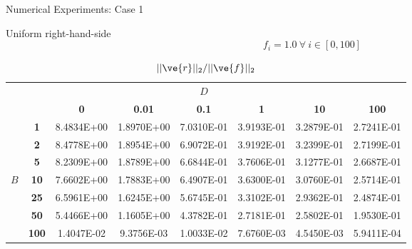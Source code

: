 \documentclass{beamer}
\begin{document}
\begin{frame}{Numerical Experiments: Case 1}

  Uniform right-hand-side
  \[
  f_i = 1.0\ \forall\ i \in [0,100]
  \]

  {\tiny
    \begin{table}[htpb!]
      \begin{center}
        \caption{$||\ve{r}||_2 / ||\ve{f}||_2$}
        \begin{tabular}{cccccccc}\hline\hline
          \multicolumn{1}{c}{} & \multicolumn{1}{c}{}&
          \multicolumn{1}{c}{}& \multicolumn{1}{c}{}&
          \multicolumn{1}{c}{$D$} & \multicolumn{1}{c}{}&
          \multicolumn{1}{c}{}& \multicolumn{1}{c}{} \\
          & & \textbf{0} & \textbf{0.01} & \textbf{0.1} & \textbf{1} & \textbf{10} & \textbf{100} \\
          & \textbf{1} & 8.4834E+00 & 1.8970E+00 & 7.0310E-01 & 3.9193E-01 & 3.2879E-01 &
          2.7241E-01 \\
          & \textbf{2} & 8.4778E+00 & 1.8954E+00 & 6.9072E-01 & 3.9192E-01 & 3.2399E-01 &
          2.7199E-01 \\
          & \textbf{5} & 8.2309E+00 & 1.8789E+00 & 6.6844E-01 & 3.7606E-01 & 3.1277E-01 &
          2.6687E-01 \\
          $B$ & \textbf{10} & 7.6602E+00 & 1.7883E+00 & 6.4907E-01 & 3.6300E-01 & 3.0760E-01 &
          2.5714E-01 \\
          & \textbf{25} & 6.5961E+00 & 1.6245E+00 & 5.6745E-01 & 3.3102E-01 & 2.9362E-01 &
          2.4874E-01 \\
          & \textbf{50} & 5.4466E+00 & 1.1605E+00 & 4.3782E-01 & 2.7181E-01 & 2.5802E-01 &
          1.9530E-01 \\
          & \textbf{100} & 1.4047E-02 & 9.3756E-03 & 1.0033E-02 & 7.6760E-03 & 4.5450E-03 &
          5.9411E-04 \\
          \hline\hline
        \end{tabular}
      \end{center}
    \end{table}
  }

\end{frame}
\end{document}
